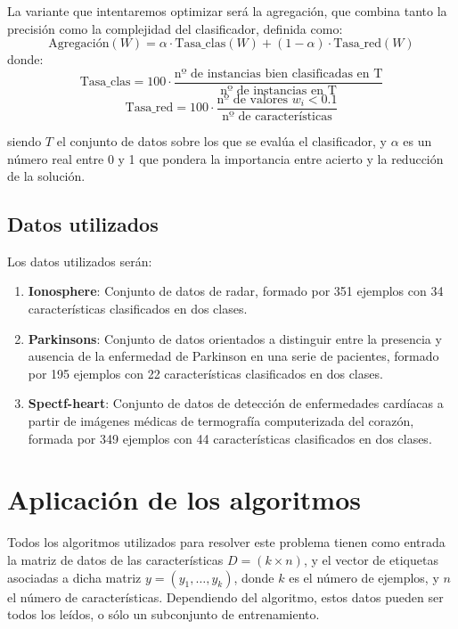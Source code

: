\documentclass[11pt,a4paper]{article}
\begin{document}
La variante que intentaremos optimizar será la agregación, que combina tanto la precisión como la complejidad del clasificador, definida como:
\begin{equation} \label{eq:objetivo}
\text{Agregación}(W) = \alpha \cdot \text{Tasa\_clas}(W) + (1 - \alpha) \cdot \text{Tasa\_red}(W)
\end{equation}
donde:
\begin{equation} \label{eq:clas}
\text{Tasa\_clas} = 100 \cdot \frac{\text{nº de instancias bien clasificadas en T}}{\text{nº de instancias en T}}
\end{equation}
\begin{equation} \label{eq:red}
\text{Tasa\_red} = 100 \cdot \frac{\text{nº de valores } w_{i} < 0.1}{\text{nº de características}}
\end{equation}

siendo $T$ el conjunto de datos sobre los que se evalúa el clasificador, y $\alpha$ es un número real entre 0 y 1 que pondera la importancia entre acierto y la reducción de la solución.

\subsection{Datos utilizados}

Los datos utilizados serán:
\begin{enumerate}
\item \textbf{Ionosphere}: Conjunto de datos de radar, formado por 351 ejemplos con 34 características clasificados en dos clases.
\item \textbf{Parkinsons}: Conjunto de datos orientados a distinguir entre la presencia y ausencia de la enfermedad de Parkinson en una serie de pacientes, formado por 195 ejemplos con 22 características clasificados en dos clases.
\item \textbf{Spectf-heart}: Conjunto de datos de detección de enfermedades cardíacas a partir de imágenes médicas de termografía computerizada del corazón, formada por 349 ejemplos con 44 características clasificados en dos clases.
\end{enumerate}

\newpage
\section{Aplicación de los algoritmos}
Todos los algoritmos utilizados para resolver este problema tienen como entrada la matriz de datos de las características $D = (k \times n)$, y el vector de etiquetas asociadas a dicha matriz $y = (y_{1}, \dots, y_{k})$, donde $k$ es el número de ejemplos, y $n$ el número de características. Dependiendo del algoritmo, estos datos pueden ser todos los leídos, o sólo un subconjunto de entrenamiento.
\end{document}
